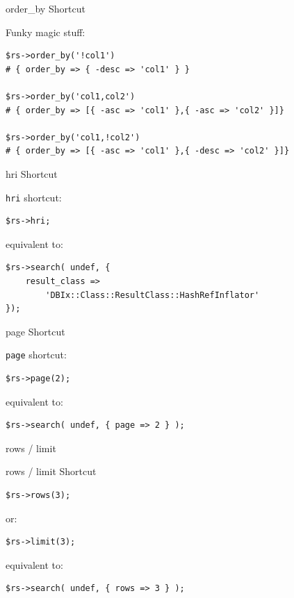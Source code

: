 \begin{frame}[fragile]{order\_by Shortcut}

Funky magic stuff:
\begin{lstlisting}
$rs->order_by('!col1')
# { order_by => { -desc => 'col1' } }

$rs->order_by('col1,col2')
# { order_by => [{ -asc => 'col1' },{ -asc => 'col2' }]}

$rs->order_by('col1,!col2')
# { order_by => [{ -asc => 'col1' },{ -desc => 'col2' }]}
\end{lstlisting}
\end{frame}

\begin{frame}[fragile]{hri Shortcut}

\verb|hri| shortcut:

\begin{lstlisting}
$rs->hri;
\end{lstlisting}

equivalent to:

\begin{lstlisting}
$rs->search( undef, {
    result_class => 
        'DBIx::Class::ResultClass::HashRefInflator'
});
\end{lstlisting}
\end{frame}

\begin{frame}[fragile]{page Shortcut}

\verb|page| shortcut:

\begin{lstlisting}
$rs->page(2);
\end{lstlisting}

equivalent to:

\begin{lstlisting}
$rs->search( undef, { page => 2 } );
\end{lstlisting}

\end{frame}

rows / limit

\begin{frame}[fragile]{rows / limit Shortcut}

\begin{lstlisting}
$rs->rows(3);
\end{lstlisting}

or:

\begin{lstlisting}
$rs->limit(3);
\end{lstlisting}

equivalent to:

\begin{lstlisting}
$rs->search( undef, { rows => 3 } );
\end{lstlisting}

\end{frame}

